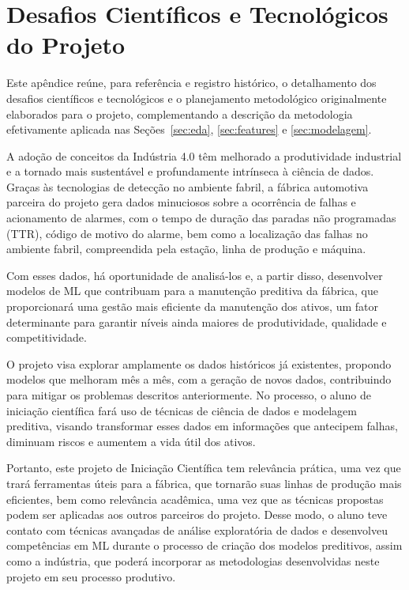 \section{Desafios Científicos e Tecnológicos do Projeto}
\label{sec:apendice-desafios}

Este apêndice reúne, para referência e registro histórico, o detalhamento dos desafios científicos e tecnológicos e o planejamento metodológico originalmente elaborados para o projeto, complementando a descrição da metodologia efetivamente aplicada nas Seções~\ref{sec:eda}, \ref{sec:features} e \ref{sec:modelagem}.

A adoção de conceitos da Indústria 4.0 têm melhorado a produtividade industrial e a tornado mais sustentável e profundamente intrínseca à ciência de dados. Graças às tecnologias de detecção no ambiente fabril, a fábrica automotiva parceira do projeto gera dados minuciosos sobre a ocorrência de falhas e acionamento de alarmes, com o tempo de duração das paradas não programadas (TTR), código de motivo do alarme, bem como a localização das falhas no ambiente fabril, compreendida pela estação, linha de produção e máquina.

Com esses dados, há oportunidade de analisá-los e, a partir disso, desenvolver modelos de ML que contribuam para a manutenção preditiva da fábrica, que proporcionará uma gestão mais eficiente da manutenção dos ativos, um fator determinante para garantir níveis ainda maiores de produtividade, qualidade e competitividade.

O projeto visa explorar amplamente os dados históricos já existentes, propondo modelos que melhoram mês a mês, com a geração de novos dados, contribuindo para mitigar os problemas descritos anteriormente. No processo, o aluno de iniciação científica fará uso de técnicas de ciência de dados e modelagem preditiva, visando transformar esses dados em informações que antecipem falhas, diminuam riscos e aumentem a vida útil dos ativos.

Portanto, este projeto de Iniciação Científica tem relevância prática, uma vez que trará ferramentas úteis para a fábrica, que tornarão suas linhas de produção mais eficientes, bem como relevância acadêmica, uma vez que as técnicas propostas podem ser aplicadas aos outros parceiros do projeto. Desse modo, o aluno teve contato com técnicas avançadas de análise exploratória de dados e desenvolveu competências em ML durante o processo de criação dos modelos preditivos, assim como a indústria, que poderá incorporar as metodologias desenvolvidas neste projeto em seu processo produtivo.

